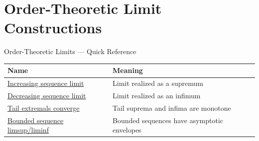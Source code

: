 \section{Order-Theoretic Limit Constructions}

\begin{toolkitbox}{Order-Theoretic Limits --- Quick Reference}
\small
\begin{tabular}{l l}
\toprule
\textbf{Name} & \textbf{Meaning} \\
\midrule
\hyperref[thm:increasing-sequence-limit-as-supremum]{Increasing sequence limit} & Limit realized as a supremum \\
\hyperref[thm:decreasing-sequence-limit-as-infimum]{Decreasing sequence limit} & Limit realized as an infimum \\
\hyperref[thm:tail-suprema-infima-converge]{Tail extremals converge} & Tail suprema and infima are monotone \\
\hyperref[thm:bounded-sequence-limsup-liminf]{Bounded sequence limsup/liminf} & Bounded sequences have asymptotic envelopes \\
\bottomrule
\end{tabular}
\end{toolkitbox}


